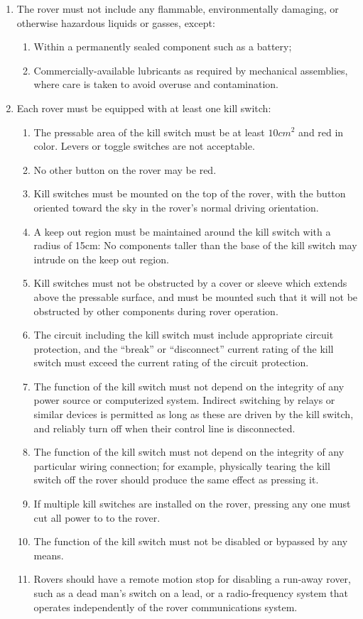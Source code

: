 \begin{enumerate}
    \item The rover must not include any flammable, environmentally damaging, or otherwise hazardous liquids or gasses, except:
    \begin{enumerate}
        \item Within a permanently sealed component such as a battery; \label{battery}
        \item Commercially-available lubricants as required by mechanical assemblies, where care is taken to avoid overuse and contamination.
    \end{enumerate}
    \item Each rover must be equipped with at least one kill switch:
    \begin{enumerate}
        \item The pressable area of the kill switch must be at least $10 cm^2$ and red in color. Levers or toggle switches are not acceptable.
        \item No other button on the rover may be red.
        \item Kill switches must be mounted on the top of the rover, with the button oriented toward the sky in the rover’s normal driving orientation.
        \item A keep out region must be maintained around the kill switch with a radius of 15cm: No components taller than the base of the kill switch may intrude on the keep out region.
        \item Kill switches must not be obstructed by a cover or sleeve which extends above the pressable surface, and must be mounted such that it will not be obstructed by other components during rover operation.
        \item The circuit including the kill switch must include appropriate circuit protection, and the “break” or “disconnect” current rating of the kill switch must exceed the current rating of the circuit protection.
        \item The function of the kill switch must not depend on the integrity of any power source or computerized system. Indirect switching by relays or similar devices is permitted as long as these are driven by the kill switch, and reliably turn off when their control line is disconnected.
        \item The function of the kill switch must not depend on the integrity of any particular wiring connection; for example, physically tearing the kill switch off the rover should produce the same effect as pressing it.
        \item If multiple kill switches are installed on the rover, pressing any one must cut all power to to the rover.
        \item The function of the kill switch must not be disabled or bypassed by any means.
        \item Rovers should have a remote motion stop for disabling a run-away rover, such as a dead man’s switch on a lead, or a radio-frequency system that operates independently of the rover communications system.
    \end{enumerate}
    
\end{enumerate}




